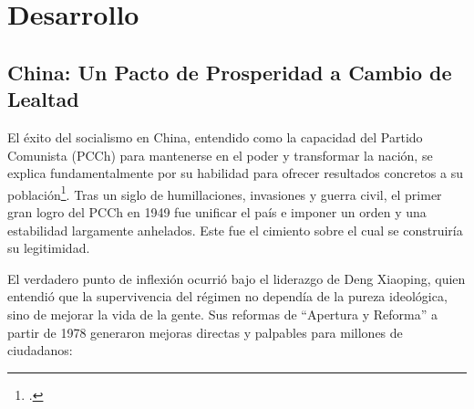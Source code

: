 \documentclass[12pt, letterpaper]{article}
\begin{document}
\newpage
\section*{Desarrollo}

\subsection*{China: Un Pacto de Prosperidad a Cambio de Lealtad}
El éxito del socialismo en China, entendido como la capacidad del Partido Comunista (PCCh) para mantenerse en el poder y transformar la nación, se explica fundamentalmente por su habilidad para ofrecer resultados concretos a su población\footcite{bbc_news_2019}. Tras un siglo de humillaciones, invasiones y guerra civil, el primer gran logro del PCCh en 1949 fue unificar el país e imponer un orden y una estabilidad largamente anhelados. Este fue el cimiento sobre el cual se construiría su legitimidad.

El verdadero punto de inflexión ocurrió bajo el liderazgo de Deng Xiaoping, quien entendió que la supervivencia del régimen no dependía de la pureza ideológica, sino de mejorar la vida de la gente. Sus reformas de ``Apertura y Reforma'' a partir de 1978 generaron mejoras directas y palpables para millones de ciudadanos:
\end{document}
